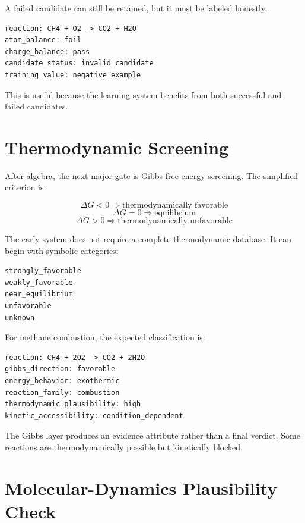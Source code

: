 \documentclass[11pt]{article}
\begin{document}
A failed candidate can still be retained, but it must be labeled honestly.

\begin{lstlisting}[caption={Failed candidate labeling}]
reaction: CH4 + O2 -> CO2 + H2O
atom_balance: fail
charge_balance: pass
candidate_status: invalid_candidate
training_value: negative_example
\end{lstlisting}

This is useful because the learning system benefits from both successful and failed candidates.

\section{Thermodynamic Screening}

After algebra, the next major gate is Gibbs free energy screening. The simplified criterion is:

\[
\Delta G < 0 \Rightarrow \text{thermodynamically favorable}
\]
\[
\Delta G = 0 \Rightarrow \text{equilibrium}
\]
\[
\Delta G > 0 \Rightarrow \text{thermodynamically unfavorable}
\]

The early system does not require a complete thermodynamic database. It can begin with symbolic categories:

\begin{lstlisting}[caption={Symbolic Gibbs categories}]
strongly_favorable
weakly_favorable
near_equilibrium
unfavorable
unknown
\end{lstlisting}

For methane combustion, the expected classification is:

\begin{lstlisting}[caption={Example thermodynamic classification}]
reaction: CH4 + 2O2 -> CO2 + 2H2O
gibbs_direction: favorable
energy_behavior: exothermic
reaction_family: combustion
thermodynamic_plausibility: high
kinetic_accessibility: condition_dependent
\end{lstlisting}

The Gibbs layer produces an evidence attribute rather than a final verdict. Some reactions are thermodynamically possible but kinetically blocked.

\section{Molecular-Dynamics Plausibility Check}
\end{document}
